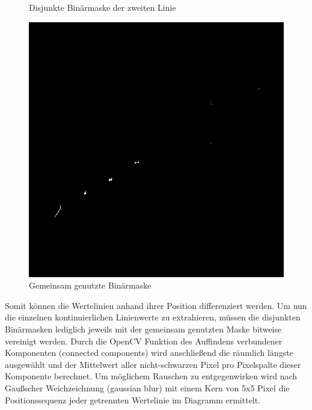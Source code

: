 \begin{figure}[h!]
\begin{minipage}{0.315\textwidth}
        \caption{ Disjunkte Binärmaske der zweiten Linie}
        \label{fig:alg_layer2}
    \end{minipage}\hfill %
    \begin{minipage}{0.315\textwidth} %
        \centering
        \includegraphics[width=\linewidth]{Implementation/img/alg_shared.png}
        \caption{ Gemeinsam genutzte Binärmaske}
        \label{fig:alg_shared}
    \end{minipage}
\end{figure}

Somit können die Wertelinien anhand ihrer Position differenziert werden. Um nun die einzelnen kontinuierlichen Linienwerte zu extrahieren, müssen die disjunkten Binärmasken lediglich jeweils mit der gemeinsam genutzten Maske bitweise vereinigt werden. Durch die OpenCV Funktion des Auffindens verbundener Komponenten (connected components) wird anschließend die räumlich längste ausgewählt und der Mittelwert aller nicht-schwarzen Pixel pro Pixelspalte dieser Komponente berechnet. Um möglichem Rauschen zu entgegenwirken wird nach Gaußscher Weichzeichnung (gaussian blur) mit einem Kern von 5x5 Pixel die Positionssequenz jeder getrennten Wertelinie im Diagramm ermittelt.

